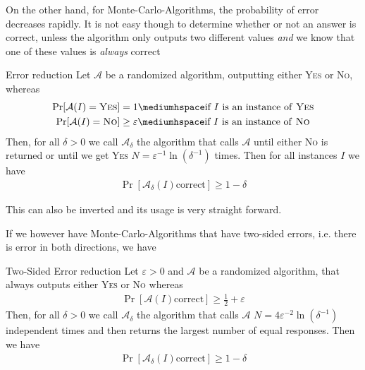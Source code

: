 On the other hand, for Monte-Carlo-Algorithms, the probability of error decreases rapidly. It is not easy though to determine whether or not an answer is correct, unless the algorithm only outputs two different values \textit{and} we know that one of these values is \textit{always} correct

\setcounter{all}{74}
\begin{theorem}[]{Error reduction}
    Let $\mathcal{A}$ be a randomized algorithm, outputting either \textsc{Yes} or \textsc{No}, whereas
    \begin{align*}
        \Pr[\mathcal{A}(I) = \textsc{Yes}] & = 1 \mediumhspace \text{if $I$ is an instance of \textsc{Yes}}             \\
        \Pr[\mathcal{A}(I) = \textsc{No}]  & \geq \varepsilon \mediumhspace \text{if $I$ is an instance of \textsc{No}}
    \end{align*}
    Then, for all $\delta > 0$ we call $\mathcal{A}_{\delta}$ the algorithm that calls $\mathcal{A}$ until either \textsc{No} is returned or until we get \textsc{Yes} $N = \varepsilon^{-1} \ln(\delta^{-1})$ times. Then for all instances $I$ we have
    \begin{align*}
        \Pr[\mathcal{A}_{\delta}(I) \text{correct}] \geq 1 - \delta
    \end{align*}
\end{theorem}
This can also be inverted and its usage is very straight forward.

\newpage

If we however have Monte-Carlo-Algorithms that have two-sided errors, i.e. there is error in both directions, we have
\begin{theorem}[]{Two-Sided Error reduction}
    Let $\varepsilon > 0$ and $\mathcal{A}$ be a randomized algorithm, that always outputs either \textsc{Yes} or \textsc{No} whereas
    \begin{align*}
        \Pr[\mathcal{A}(I) \text{correct}] \geq \frac{1}{2} + \varepsilon
    \end{align*}
    Then, for all $\delta > 0$ we call $\mathcal{A}_{\delta}$ the algorithm that calls $\mathcal{A}$ $N = 4 \varepsilon^{-2} \ln(\delta^{-1})$ independent times and then returns the largest number of equal responses. Then we have
    \begin{align*}
        \Pr[\mathcal{A}_{\delta}(I) \text{correct}] \geq 1 - \delta
    \end{align*}
\end{theorem}

